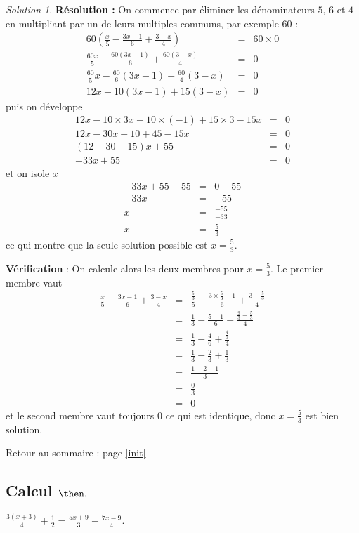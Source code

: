 \documentclass[14pt]{article}
\theoremstyle{remark}
\newtheorem*{sol}{Solution}
\newcounter{n}
\renewcommand{\it}{Retour au sommaire : page \ref{init}
	\subsection{Calcul $ \mathbf{ \then}.$}\label{\then} \stepcounter{n} }
\theoremstyle{plain}
\begin{document}
\begin{sol}
\textbf{Résolution :} On commence par éliminer les dénominateurs $5$, $6$ et $4$ en multipliant par un de leurs multiples communs, par exemple $60$ : 
\begin{eqnarray*}
60\left(\frac{x}5 - \frac{3x-1}6 + \frac{3-x}4 \right)&=& 60\times 0 \\
\frac{60x}5 - \frac{60(3x-1)}6 + \frac{60(3-x)}4 &=& 0\\ 
\frac{60}5x - \frac{60}6(3x-1) + \frac{60}4(3-x)&=&0\\
12x - 10(3x-1) +15(3-x) &=& 0
\end{eqnarray*} puis on développe
\begin{eqnarray*} 12x - 10\times 3x-10\times (-1) +15\times 3-15x &=& 0\\
12x-30x +10 +45 - 15x &=& 0 \\
(12-30-15)x +55 &=& 0 \\
-33x +55 &= &0
\end{eqnarray*}et on isole $x$
\begin{eqnarray*}-33x+55-55&=& 0-55\\
-33x&=& -55 \\
x&=&\frac{-55}{-33}\\
x&=& \frac{5}3
\end{eqnarray*}
ce qui montre que la seule solution possible est $x=\frac53$. 

\textbf{Vérification} : On calcule alors les deux membres pour $x=\frac53$. Le premier membre vaut 
\begin{eqnarray*}
\frac{x}5 - \frac{3x-1}6 + \frac{3-x}4 &=& \frac{\frac53}5 
- \frac{3\times\frac53-1}6+\frac{3-\frac53}4\\
&=& \frac13 - \frac{5-1}6 + \frac{\frac93-\frac53}4\\
&=& \frac13 - \frac46 + \frac{\frac43}4 \\
&=& \frac13- \frac23 + \frac13 \\
&=& \frac{1-2+1}3\\
&=&\frac03 \\
&=&0
\end{eqnarray*}
et le second membre vaut toujours $0$ ce qui est identique, donc $x=\frac53$ est bien solution.
\end{sol}
\it $\frac{3(x+3)}4 + \frac12 = \frac{5x+9}3 - \frac{7x-9}4$. 
\end{document}
